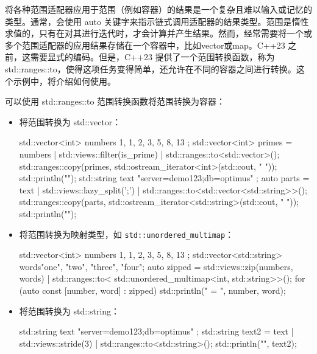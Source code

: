 
将各种范围适配器应用于范围（例如容器）的结果是一个复杂且难以输入或记忆的类型。通常，会使用 auto 关键字来指示链式调用适配器的结果类型。范围是惰性求值的，只有在对其进行迭代时，才会计算并产生结果。然而，经常需要将一个或多个范围适配器的应用结果存储在一个容器中，比如vector或map。C++23 之前，这需要显式的编码。但是，C++23 提供了一个范围转换函数，称为 std::ranges::to，使得这项任务变得简单，还允许在不同的容器之间进行转换。这个示例中，将介绍如何使用。


可以使用 std::ranges::to 范围转换函数将范围转换为容器：

\begin{itemize}
\item
将范围转换为 std::vector：

\begin{cpp}
std::vector<int> numbers{ 1, 1, 2, 3, 5, 8, 13 };
std::vector<int> primes = numbers |
                          std::views::filter(is_prime) |
                          std::ranges::to<std::vector>();
std::ranges::copy(primes,
                  std::ostream_iterator<int>(std::cout, " "));
std::println("");
std::string text{ "server=demo123;db=optimus" };
auto parts = text |
             std::views::lazy_split(';') |
             std::ranges::to<std::vector<std::string>>();
std::ranges::copy(parts,
                  std::ostream_iterator<std::string>(std::cout, " "));
std::println("");
\end{cpp}

\item
将范围转换为映射类型，如 \verb|std::unordered_multimap|：

\begin{cpp}
std::vector<int> numbers{ 1, 1, 2, 3, 5, 8, 13 };
std::vector<std::string> words{"one", "two", "three", "four"};
auto zipped = std::views::zip(numbers, words) |
              std::ranges::to<
                std::unordered_multimap<int, std::string>>();
for (auto const [number, word] : zipped)
{
    std::println("{} = {}", number, word);
}
\end{cpp}

\item
将范围转换为 std::string：

\begin{cpp}
std::string text{ "server=demo123;db=optimus" };
std::string text2 = text |
                    std::views::stride(3) |
                    std::ranges::to<std::string>();
std::println("{}", text2);
\end{cpp}
\end{itemize}

